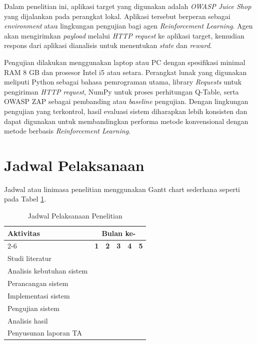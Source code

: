 Dalam penelitian ini, aplikasi target yang digunakan adalah \textit{OWASP Juice Shop} yang dijalankan pada perangkat lokal. Aplikasi tersebut berperan sebagai \textit{environment} atau lingkungan pengujian bagi agen \textit{Reinforcement Learning}. Agen akan mengirimkan \textit{payload} melalui \textit{HTTP request} ke aplikasi target, kemudian respons dari aplikasi dianalisis untuk menentukan \textit{state} dan \textit{reward}.

Pengujian dilakukan menggunakan laptop atau PC dengan spesifikasi minimal RAM 8 GB dan prosesor Intel i5 atau setara. Perangkat lunak yang digunakan meliputi Python sebagai bahasa pemrograman utama, library \textit{Requests} untuk pengiriman \textit{HTTP request}, NumPy untuk proses perhitungan Q-Table, serta OWASP ZAP sebagai pembanding atau \textit{baseline} pengujian. Dengan lingkungan pengujian yang terkontrol, hasil evaluasi sistem diharapkan lebih konsisten dan dapat digunakan untuk membandingkan performa metode konvensional dengan metode berbasis \textit{Reinforcement Learning}.


\section{Jadwal Pelaksanaan}

Jadwal atau linimasa penelitian menggunakan Gantt chart sederhana seperti pada Tabel \ref{tab:jadwal_pelaksanaan}.

\begin{table}[H]
\centering
\caption{Jadwal Pelaksanaan Penelitian}
\label{tab:jadwal_pelaksanaan}
\begin{tabular}{lccccc}
\hline
\textbf{Aktivitas} & \multicolumn{5}{c}{\textbf{Bulan ke-}} \\ 
\cline{2-6}
 & \textbf{1} & \textbf{2} & \textbf{3} & \textbf{4} & \textbf{5} \\ 
\hline

Studi literatur 
& \cellcolor{gray!60} & \cellcolor{gray!60} &  &  &  \\

Analisis kebutuhan sistem 
& \cellcolor{gray!60} &  &  &  &  \\

Perancangan sistem 
&  & \cellcolor{gray!60} & \cellcolor{gray!60} &  &  \\

Implementasi sistem 
&  &  & \cellcolor{gray!60} & \cellcolor{gray!60} &  \\

Pengujian sistem 
&  &  &  & \cellcolor{gray!60} & \cellcolor{gray!60} \\

Analisis hasil 
&  &  &  &  & \cellcolor{gray!60} \\

Penyusunan laporan TA 
& \cellcolor{gray!60} & \cellcolor{gray!60} & \cellcolor{gray!60} & \cellcolor{gray!60} & \cellcolor{gray!60} \\

\hline
\end{tabular}
\end{table}
